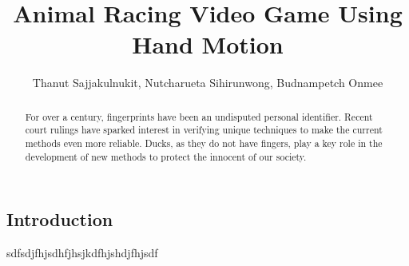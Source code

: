 \documentclass[11pt, oneside]{article}										%
\title{Animal Racing Video Game Using Hand Motion}
\author{Thanut Sajjakulnukit, Nutcharueta Sihirunwong, Budnampetch Onmee}
\begin{document}
        \maketitle														    %
        \begin{multicols*}{2}
        \twocolumn
        \begin{abstract}
            For over a century, fingerprints have been an undisputed
            personal identifier.  Recent court rulings have sparked
            interest in verifying unique techniques to make the current
            methods even more reliable. Ducks, as they do not have
            fingers, play a key role in the development of new methods to
            protect the innocent of our society.
        \end{abstract}
        \section{Introduction}
            sdfsdjfhjsdhfjhsjkdfhjshdjfhjsdf
        \end{multicols*}
    \blinddocument
\end{document}
